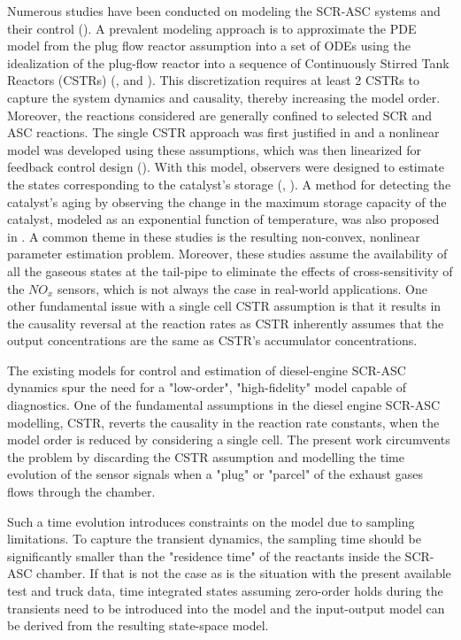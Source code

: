 Numerous studies have been conducted on modeling the SCR-ASC systems and their control (\cite{yuan2015diesel}). A
prevalent modeling approach is to approximate the PDE model from the plug flow reactor assumption into a set of ODEs
using the idealization of the plug-flow reactor into a sequence of Continuously Stirred Tank Reactors (CSTRs)
(\cite{hsieh2011development}, and \cite{nova2014urea}). This discretization requires at least 2 CSTRs to capture the
system dynamics and causality, thereby increasing the model order. Moreover, the reactions considered are generally
confined to selected SCR and ASC reactions. The single CSTR approach was first justified in
\cite{devarakonda2008adequacy} and a nonlinear model was developed using these assumptions, which was then linearized
for feedback control design (\cite{devarakonda2009model}). With this model, observers were designed to estimate the
states corresponding to the catalyst's storage (\cite{ma2017observer}, \cite{jain2020term}). A method for detecting the
catalyst's aging by observing the change in the maximum storage capacity of the catalyst, modeled as an exponential
function of temperature, was also proposed in \cite{ma2017observer}. A common theme in these studies is the resulting
non-convex, nonlinear parameter estimation problem. Moreover, these studies assume the availability of all the gaseous
states at the tail-pipe to eliminate the effects of cross-sensitivity of the $NO_x$ sensors, which is not always the
case in real-world applications. One other fundamental issue with a single cell CSTR assumption is that it results in
the causality reversal at the reaction rates as CSTR inherently assumes that the output concentrations are the same as
CSTR's accumulator concentrations.

The existing models for control and estimation of diesel-engine SCR-ASC dynamics spur the need for a "low-order",
"high-fidelity" model capable of diagnostics. One of the fundamental assumptions in the diesel engine SCR-ASC modelling,
CSTR, reverts the causality in the reaction rate constants, when the model order is reduced by considering a single
cell. The present work circumvents the problem by discarding the CSTR assumption and modelling the time evolution of the
sensor signals when a "plug" or "parcel" of the exhaust gases flows through the chamber.

Such a time evolution introduces constraints on the model due to sampling limitations. To capture the transient
dynamics, the sampling time should be significantly smaller than the "residence time" of the reactants inside the
SCR-ASC chamber. If that is not the case as is the situation with the present available test and truck data, time
integrated states assuming zero-order holds during the transients need to be introduced into the model and the
input-output model can be derived from the resulting state-space model.

